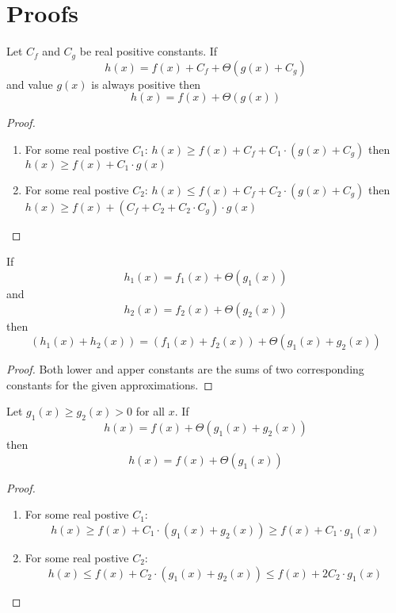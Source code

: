\section{Proofs}
\label{sec:proofs_appendix}

\begin{lemma}
\label{lem:theta_constant}
Let $C_f$ and $C_g$ be real positive constants. If
\[ h(x) = f(x) + C_f + \Theta(g(x) + C_g) \]
and value $g(x)$ is always positive then
\[ h(x) = f(x) + \Theta(g(x)) \]
\end{lemma}
\begin{proof}
\begin{enumerate}
\item For some real  postive $C_1$: $h(x) \ge f(x) + C_f + C_1 \cdot (g(x) + C_g)$ then \\ $h(x) \ge f(x) + C_1 \cdot g(x)$
\item For some real  postive $C_2$: $h(x) \le f(x) + C_f + C_2 \cdot (g(x) + C_g)$ then \\ $h(x) \ge f(x) + (C_f + C_2 + C_2 \cdot C_g) \cdot g(x)$
\end{enumerate}
\end{proof}

\begin{lemma}
\label{lem:theta_sum}
If
\[ h_1(x) = f_1(x) + \Theta(g_1(x)) \]
and
\[ h_2(x) = f_2(x) + \Theta(g_2(x)) \]
then
\[ (h_1(x) + h_2(x)) = (f_1(x) + f_2(x)) + \Theta(g_1(x) + g_2(x)) \]
\end{lemma}
\begin{proof}
Both lower and apper constants are the sums of two corresponding constants for the given approximations.
\end{proof}

\begin{lemma}
\label{lem:theta_absorb}
Let $g_1(x) \ge g_2(x) > 0$ for all $x$.
If
\[ h(x) = f(x) + \Theta(g_1(x) + g_2(x)) \]
then
\[ h(x) = f(x) + \Theta(g_1(x)) \]
\end{lemma}
\begin{proof}
\begin{enumerate}
\item For some real  postive $C_1$: \[ h(x) \ge f(x) + C_1 \cdot (g_1(x) + g_2(x)) \ge f(x) + C_1 \cdot g_1(x) \]
\item For some real  postive $C_2$: \[ h(x) \le f(x) + C_2 \cdot (g_1(x) + g_2(x)) \le f(x) + 2 C_2 \cdot g_1(x) \]
\end{enumerate}
\end{proof}


